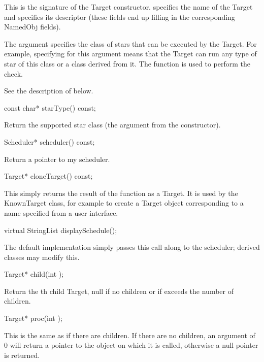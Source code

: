 This is the signature of the Target constructor.  specifies
the name of the Target and  specifies its descriptor (these
fields end up filling in the corresponding NamedObj fields).

The  argument specifies the class of stars that can be
executed by the Target.  For example, specifying 
for this argument means that the Target can run any type of star of
this class or a class derived from it.  The  function is
used to perform the check.

See the description of  below.

\begin{example}
const char* starType() const;
\end{example}

Return the supported star class (the  argument from
the constructor).

\begin{example}
Scheduler* scheduler() const;
\end{example}

Return a pointer to my scheduler.

\begin{example}
Target* cloneTarget() const;
\end{example}

This simply returns the result of the  function as a Target.
It is used by the KnownTarget class, for example to create a Target
object corresponding to a name specified from a user interface.

\begin{example}
virtual StringList displaySchedule();
\end{example}

The default implementation simply passes this call along to the
scheduler; derived classes may modify this.

\begin{example}
Target* child(int );
\end{example}

Return the th child Target, null if no children or if
 exceeds the number of children.

\begin{example}
Target* proc(int );
\end{example}

This is the same as  if there are children.  If
there are no children, an argument of 0 will return a pointer
to the object on which it is called, otherwise a null pointer
is returned.

